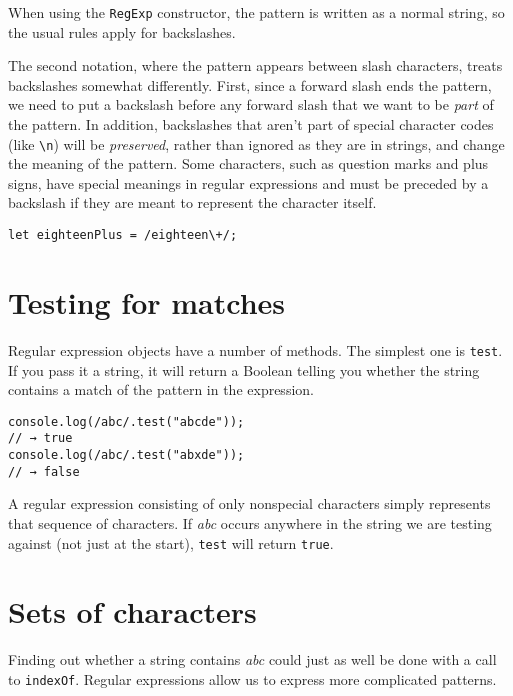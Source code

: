 When using the \lstinline`RegExp` constructor, the pattern is written as a normal string, so the usual rules apply for backslashes.

The second notation, where the pattern appears between slash characters, treats backslashes somewhat differently. First, since a forward slash ends the pattern, we need to put a backslash before any forward slash that we want to be \emph{part} of the pattern. In addition, backslashes that aren't part of special character codes (like \lstinline`\n`) will be \emph{preserved}, rather than ignored as they are in strings, and change the meaning of the pattern. Some characters, such as question marks and plus signs, have special meanings in regular expressions and must be preceded by a backslash if they are meant to represent the character itself.

\begin{lstlisting}
let eighteenPlus = /eighteen\+/;
\end{lstlisting}
\noindent

\section{Testing for matches}

Regular expression objects have a number of methods. The simplest one is \lstinline`test`. If you pass it a string, it will return a Boolean telling you whether the string contains a match of the pattern in the expression.

\begin{lstlisting}
console.log(/abc/.test("abcde"));
// → true
console.log(/abc/.test("abxde"));
// → false
\end{lstlisting}
\noindent{}

A regular expression consisting of only nonspecial characters simply represents that sequence of characters. If \emph{abc} occurs anywhere in the string we are testing against (not just at the start), \lstinline`test` will return \lstinline`true`.

\section{Sets of characters}

Finding out whether a string contains \emph{abc} could just as well be done with a call to \lstinline`indexOf`. Regular expressions allow us to express more complicated patterns.

